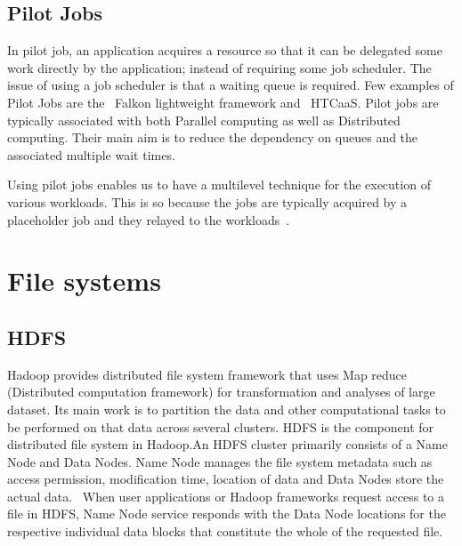 {     \pv

\subsection{Pilot Jobs}

In pilot job, an application acquires a resource so that it can be
delegated some work directly by the application; instead of requiring
some job scheduler. The issue of using a job scheduler is that a
waiting queue is required. Few examples of Pilot Jobs are
the~\cite{pilot-job-falkon-paper-2007} Falkon lightweight framework
and~\cite{pilot-job-htcaas-paper-2007} HTCaaS. Pilot jobs are
typically associated with both Parallel computing as well as
Distributed computing. Their main aim is to reduce the dependency on
queues and the associated multiple wait times.

Using pilot jobs enables us to have a multilevel technique for the
execution of various workloads. This is so because the jobs are
typically acquired by a placeholder job and they relayed to the
workloads~\cite{www-pilot-job-paper-2016}.

\section{File systems}
\label{S:o-file-systems}


\subsection{HDFS}
     
     Hadoop provides distributed file system framework that uses Map
     reduce (Distributed computation framework) for transformation and
     analyses of large dataset.  Its main work is to partition the
     data and other computational tasks to be performed on that data
     across several clusters.  HDFS is the component for distributed
     file system in Hadoop.An HDFS cluster primarily consists of a
     Name Node and Data Nodes. Name Node manages the file system
     metadata such as access permission, modification time, location
     of data and Data Nodes store the actual data.   When user
     applications or Hadoop frameworks request access to a file in
     HDFS, Name Node service responds with the Data Node locations for
     the respective individual data blocks that constitute the whole
     of the requested file\cite{www-hdfs}.

}
